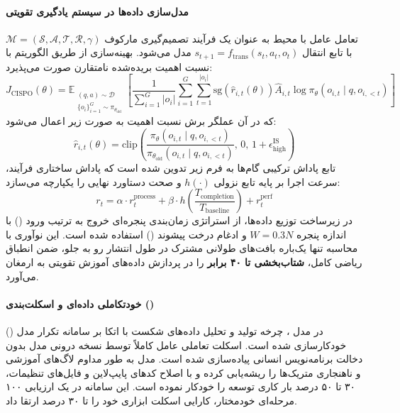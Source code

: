 \paragraph*{مدل‌سازی داده‌ها در سیستم یادگیری تقویتی }
تعامل عامل با محیط به عنوان یک فرآیند تصمیم‌گیری مارکوف $\mathcal{M} = (\mathcal{S}, \mathcal{A}, \mathcal{T}, \mathcal{R}, \gamma)$ با تابع انتقال $s_{t+1} = f_{\text{trans}}(s_t, a_t, o_t)$ مدل می‌شود. بهینه‌سازی از طریق الگوریتم  \cite{minimax2025cispo} با نسبت اهمیت بریده‌شده نامتقارن صورت می‌پذیرد:
\begin{equation}
    J_{\text{CISPO}}(\theta) = \mathbb{E}_{\substack{(q,a) \sim \mathcal{D} \\ \{o_i\}_{i=1}^G \sim \pi_{\theta_{\text{old}}}}} \left[ \frac{1}{\sum_{i=1}^G |o_i|} \sum_{i=1}^G \sum_{t=1}^{|o_i|} \text{sg}\left(\hat{r}_{i,t}(\theta)\right) \hat{A}_{i,t} \log \pi_\theta(o_{i,t} \mid q, o_{i,<t}) \right]
\end{equation}
که در آن عملگر برش نسبت اهمیت به صورت زیر اعمال می‌شود:
\begin{equation}
    \hat{r}_{i,t}(\theta) = \text{clip}\left( \frac{\pi_\theta(o_{i,t} \mid q, o_{i,<t})}{\pi_{\theta_{\text{old}}}(o_{i,t} \mid q, o_{i,<t})}, \, 0, \, 1 + \epsilon_{\text{high}}^{\text{IS}} \right)
\end{equation}
تابع پاداش ترکیبی گام‌ها به فرم زیر تدوین شده است که پاداش ساختاری فرآیند، سرعت اجرا بر پایه تابع نزولی $h(\cdot)$ و صحت دستاورد نهایی را یکپارچه می‌سازد:
\begin{equation}
    r_t = \alpha \cdot r_t^{\text{process}} + \beta \cdot h\left(\frac{T_{\text{completion}}}{T_{\text{baseline}}}\right) + r_t^{\text{perf}}
\end{equation}
در زیرساخت توزیع داده‌ها، از استراتژی زمان‌بندی پنجره‌ای خروج به ترتیب ورود () با اندازه پنجره $W = 0.3N$ و ادغام درخت پیشوند () استفاده شده است. این نوآوری با محاسبه تنها یک‌باره بافت‌های طولانی مشترک در طول انتشار رو به جلو، ضمن انطباق ریاضی کامل، \textbf{شتاب‌بخشی تا ۴۰ برابر} را در پردازش داده‌های آموزش تقویتی به ارمغان می‌آورد.

\paragraph*{خودتکاملی داده‌ای و اسکلت‌بندی ()}
در مدل ، چرخه تولید و تحلیل داده‌های شکست با اتکا بر سامانه تکرار مدل () خودکارسازی شده است. اسکلت تعاملی عامل کاملاً توسط نسخه درونی مدل بدون دخالت برنامه‌نویس انسانی پیاده‌سازی شده است. مدل به طور مداوم لاگ‌های آموزشی و ناهنجاری متریک‌ها را ریشه‌یابی کرده و با اصلاح کدهای پایپ‌لاین و فایل‌های تنظیمات، ۳۰ تا ۵۰ درصد بار کاری توسعه را خودکار نموده است. این سامانه در یک ارزیابی ۱۰۰ مرحله‌ای خودمختار، کارایی اسکلت ابزاری خود را تا ۳۰ درصد ارتقا داد.

